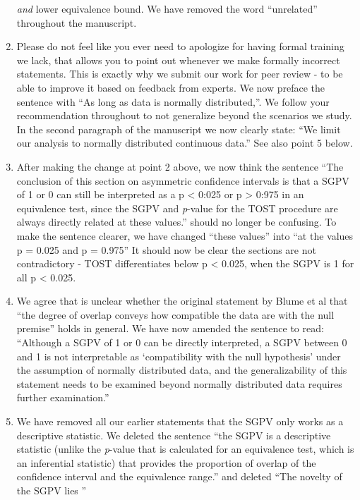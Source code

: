 \documentclass[man]{apa6}
\begin{document}
\begin{enumerate}
{  \emph{and} lower equivalence bound.} We have removed the word
  \enquote{unrelated} throughout the manuscript.
\item
  Please do not feel like you ever need to apologize for having formal
  training we lack, that allows you to point out whenever we make
  formally incorrect statements. This is exactly why we submit our work
  for peer review - to be able to improve it based on feedback from
  experts. We now preface the sentence with \enquote{As long as data is
  normally distributed,}. We follow your recommendation throughout to
  not generalize beyond the scenarios we study. In the second paragraph
  of the manuscript we now clearly state: \enquote{We limit our analysis
  to normally distributed continuous data.} See also point 5 below.
\item
  After making the change at point 2 above, we now think the sentence
  \enquote{The conclusion of this section on asymmetric confidence
  intervals is that a SGPV of 1 or 0 can still be interpreted as a p
  \textless{} 0:025 or p \textgreater{} 0:975 in an equivalence test,
  since the SGPV and \emph{p}-value for the TOST procedure are always
  directly related at these values.} should no longer be confusing. To
  make the sentence clearer, we have changed \enquote{these values} into
  \enquote{at the values p = 0.025 and p = 0.975} It should now be clear
  the sections are not contradictory - TOST differentiates below p
  \textless{} 0.025, when the SGPV is 1 for all p \textless{} 0.025.
\item
  We agree that is unclear whether the original statement by Blume et al
  that \enquote{the degree of overlap conveys how compatible the data
  are with the null premise} holds in general. We have now amended the
  sentence to read: \enquote{Although a SGPV of 1 or 0 can be directly
  interpreted, a SGPV between 0 and 1 is not interpretable as
  \enquote{compatibility with the null hypothesis} under the assumption
  of normally distributed data, and the generalizability of this
  statement needs to be examined beyond normally distributed data
  requires further examination.}
\item
  We have removed all our earlier statements that the SGPV only works as
  a descriptive statistic. We deleted the sentence \enquote{the SGPV is
  a descriptive statistic (unlike the \emph{p}-value that is calculated
  for an equivalence test, which is an inferential statistic) that
  provides the proportion of overlap of the confidence interval and the
  equivalence range.} and deleted \enquote{The novelty of the SGPV lies
}
\end{enumerate}
\end{document}
